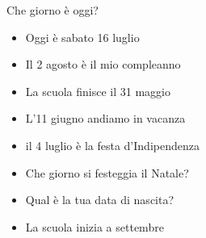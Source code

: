 \documentclass[letter,11pt]{article}
\begin{document}
Che giorno è oggi?
\begin{multicols}{2}
\begin{itemize}
    \item Oggi è sabato 16 luglio
    \item Il 2 agosto è il mio compleanno
    \item La scuola finisce il 31 maggio
    \item L'11 giugno andiamo in vacanza
    \item il 4 luglio è la festa d'Indipendenza
    \item Che giorno si festeggia il Natale?
    \item Qual è la tua data di nascita?
    \item La scuola inizia a settembre
\end{itemize}
\end{multicols}
\end{document}
